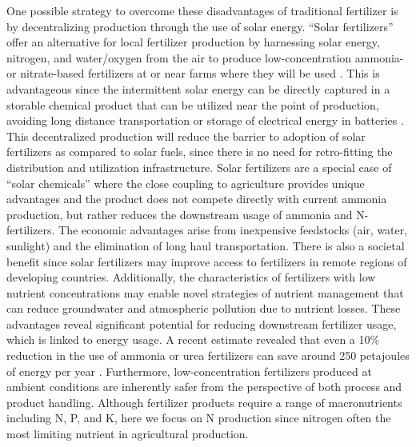 One possible strategy to overcome these disadvantages of traditional fertilizer is by decentralizing production through the use of solar energy. ``Solar fertilizers'' offer an alternative for local fertilizer production by harnessing solar energy, nitrogen, and water/oxygen from the air to produce low-concentration ammonia- or nitrate-based fertilizers at or near farms where they will be used \cite{Jewess_2016}. This is advantageous since the intermittent solar energy can be directly captured in a storable chemical product that can be utilized near the point of production, avoiding long distance transportation or storage of electrical energy in batteries \cite{MacKay_2013}. This decentralized production will reduce the barrier to adoption of solar fertilizers as compared to solar fuels, since there is no need for retro-fitting the distribution and utilization infrastructure. Solar fertilizers are a special case of ``solar chemicals'' where the close coupling to agriculture provides unique advantages and the product does not compete directly with current ammonia production, but rather reduces the downstream usage of ammonia and N-fertilizers. The economic advantages arise from inexpensive feedstocks (air, water, sunlight) and the elimination of long haul transportation. There is also a societal benefit since solar fertilizers may improve access to fertilizers in remote regions of developing countries. Additionally, the characteristics of fertilizers with low nutrient concentrations may enable novel strategies of nutrient management that can reduce groundwater and atmospheric pollution due to nutrient losses. These advantages reveal significant potential for reducing downstream fertilizer usage, which is linked to energy usage. A recent estimate revealed that even a 10\% reduction in the use of ammonia or urea fertilizers can save around 250 petajoules of energy per year \cite{Levi_2018}. Furthermore, low-concentration fertilizers produced at ambient conditions are inherently safer from the perspective of both process and product handling. Although fertilizer products require a range of macronutrients including N, P, and K, here we focus on N production since nitrogen often the most limiting nutrient in agricultural production\cite{Yousaf2017, VanderVelde2014}.

